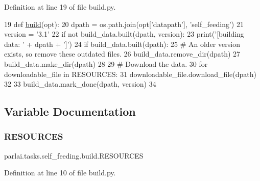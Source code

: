 Definition at line 19 of file build.\+py.


\begin{DoxyCode}
19 \textcolor{keyword}{def }\hyperlink{namespacedialog__babi__feedback_1_1build_a7a9d289f7493a5ded13c4b7f071b6184}{build}(opt):
20     dpath = os.path.join(opt[\textcolor{stringliteral}{'datapath'}], \textcolor{stringliteral}{'self\_feeding'})
21     version = \textcolor{stringliteral}{'3.1'}
22     \textcolor{keywordflow}{if} \textcolor{keywordflow}{not} build\_data.built(dpath, version):
23         print(\textcolor{stringliteral}{'[building data: '} + dpath + \textcolor{stringliteral}{']'})
24         \textcolor{keywordflow}{if} build\_data.built(dpath):
25             \textcolor{comment}{# An older version exists, so remove these outdated files.}
26             build\_data.remove\_dir(dpath)
27         build\_data.make\_dir(dpath)
28 
29         \textcolor{comment}{# Download the data.}
30         \textcolor{keywordflow}{for} downloadable\_file \textcolor{keywordflow}{in} RESOURCES:
31             downloadable\_file.download\_file(dpath)
32 
33         build\_data.mark\_done(dpath, version)
34 \end{DoxyCode}


\subsection{Variable Documentation}
\mbox{\label{namespaceparlai_1_1tasks_1_1self__feeding_1_1build_a36785c9ba098b24f10266cd123c8f514}} 
\subsubsection{\texorpdfstring{R\+E\+S\+O\+U\+R\+C\+ES}{RESOURCES}}
{\footnotesize\ttfamily parlai.\+tasks.\+self\+\_\+feeding.\+build.\+R\+E\+S\+O\+U\+R\+C\+ES}



Definition at line 10 of file build.\+py.

